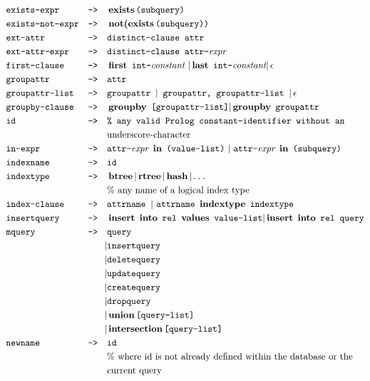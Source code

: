 \begin{align*}
&\texttt{exists-expr}&\texttt{-->}\quad &\operatorname{\textbf{exists}}\texttt{(subquery)} \\
&\texttt{exists-not-expr}&\texttt{-->}\quad &\operatorname{\textbf{not(exists}}\texttt{(subquery))} \\
&\texttt{ext-attr}&\texttt{-->}\quad &\texttt{distinct-clause attr}									\\
&\texttt{ext-attr-expr}&\texttt{-->}\quad &\texttt{distinct-clause attr-}\textit{expr}									\\
&\texttt{first-clause}&\texttt{-->}\quad &\operatorname{\textbf{first}}\ \texttt{int-}\textit{constant }	|\operatorname{\textbf{last}}\ \texttt{int-}\textit{constant}	|\operatorname{\textbf{$\epsilon$}}							\\
&\texttt{groupattr}&\texttt{-->}\quad &\texttt{attr}									\\
&\texttt{groupattr-list}&\texttt{-->}\quad &\texttt{groupattr }	|\texttt{ groupattr, groupattr-list }	|\operatorname{\textbf{$\epsilon$}}							\\
&\texttt{groupby-clause}&\texttt{-->}\quad &\operatorname{\textbf{groupby}}\ \texttt{[groupattr-list]}	|\operatorname{\textbf{groupby}}\ \texttt{groupattr}								\\
&\texttt{id}&\texttt{-->}\quad &\texttt{\% any valid Prolog constant-identifier without an} \\
&&&\text{underscore-character}									\\
&\texttt{in-expr}&\texttt{-->}\quad &\texttt{attr-}\textit{expr}\ \operatorname{\textbf{in}}\ \texttt{(value-list)}\ |\ \texttt{attr-}\textit{expr}\ \operatorname{\textbf{in}}\ \texttt{(subquery)}\\
&\texttt{indexname}&\texttt{-->}\quad &\texttt{id}									\\
&\texttt{indextype}&\texttt{-->}\quad &\operatorname{\textbf{btree}}	|\operatorname{\textbf{rtree}}	|\operatorname{\textbf{hash}}	|\texttt{\dots} \\
&&&\text{\% any name of a logical index type}						\\
&\texttt{index-clause}&\texttt{-->}\quad &\texttt{attrname }	|\ \texttt{attrname}\ \operatorname{\textbf{indextype}}\ \texttt{indextype}								\\
&\texttt{insertquery}&\texttt{-->}\quad &\operatorname{\textbf{insert}}\ \operatorname{\textbf{into}}\ \texttt{rel}\ \operatorname{\textbf{values}}\ \texttt{value-list}	|\operatorname{\textbf{insert}}\ \operatorname{\textbf{into}}\ \texttt{rel query}								\\
&\texttt{mquery}&\texttt{-->}\quad&\texttt{query}	\\
&&|&\texttt{insertquery}	\\
&&|&\texttt{deletequery}	\\
&&|&\texttt{updatequery}	\\
&&|&\texttt{createquery}	\\
&&|&\texttt{dropquery}	\\
&&|&\operatorname{\textbf{union}}\texttt{[query-list]}	\\
&&|&\operatorname{\textbf{intersection}}\texttt{[query-list]}		\\
&\texttt{newname}&\texttt{-->}\quad &\texttt{id} \\
&&&\text{\% where id is not already defined within the database or the} \\
&&&\text{current query} \\
\end{align*}

